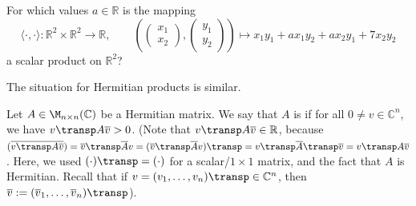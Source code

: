 \begin{exercise}
  \label{exc:inner_product_parameter_a}
  For which values $a \in \mathbb{R}$ is the mapping
  \[
  \langle \cdot, \cdot \rangle : \mathbb{R}^2 \times \mathbb{R}^2 \longrightarrow \mathbb{R}, \qquad \left( \begin{pmatrix} x_1 \\ x_2 \end{pmatrix}, \begin{pmatrix} y_1 \\ y_2 \end{pmatrix} \right) \longmapsto x_1 y_1 + a x_1 y_2 + a x_2 y_1 + 7 x_2 y_2
  \]
  a scalar product on $\mathbb{R}^2$?
\end{exercise}

The situation for Hermitian products is similar.

\begin{definition}
\label{def:positive_definite_matrix_complex}
    Let $A \in \M_{n \times n}(\mathbb{C})$ be a Hermitian matrix. We say that $A$ is  if for all $0 \neq v \in \mathbb{C}^n$, we have $v\transp A \overline{v} > 0$.
    (Note that $v\transp A \overline{v} \in \mathbb{R}$, because $(\overline{v\transp A \overline{v}}) = \overline{v}\transp \overline{A} v = (\overline{v}\transp \overline{A} v)\transp = v\transp \overline{A}\transp \overline{v} = v\transp A \overline{v}$. Here, we used $(\cdot)\transp = (\cdot)$ for a scalar/$1\times1$ matrix, and the fact that $A$ is Hermitian. Recall that if $v = (v_1, \dots, v_n)\transp \in \mathbb{C}^n$, then $\overline{v} := (\overline{v}_1, \dots, \overline{v}_n)\transp$).
\end{definition}

